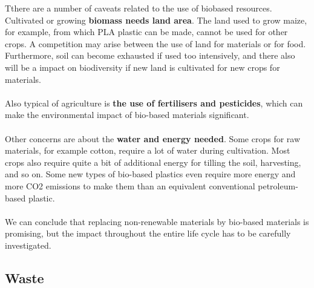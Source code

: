 \documentclass[../summary.tex]{subfiles}
\begin{document}
	Tthere are a number of caveats related to the use of biobased resources. Cultivated or growing \textbf{biomass needs land area}. The land used to grow maize, for example, from which PLA plastic can be made, cannot be used for other crops. A competition may arise between the use of land for materials or for food. Furthermore, soil can become exhausted if used too intensively, and there also will be a impact on biodiversity if new land is cultivated for new crops for materials. 
	\\\\
	Also typical of agriculture is \textbf{the use of fertilisers and pesticides}, which can make the environmental impact of bio-based materials significant.
	\\\\
	Other concerns are about the \textbf{water and energy needed}. Some crops for raw materials, for example cotton, require a lot of water during cultivation. Most crops also require quite a bit of additional energy for tilling the soil, harvesting, and so on. Some new types of bio-based plastics even require more energy and more CO2 emissions to make them than an equivalent conventional petroleum-based plastic. 
	\\\\
	We can conclude that replacing non-renewable materials by bio-based materials is promising, but the impact throughout the entire life cycle has to be carefully investigated.
	
	\subsection{Waste}
	
\end{document}
